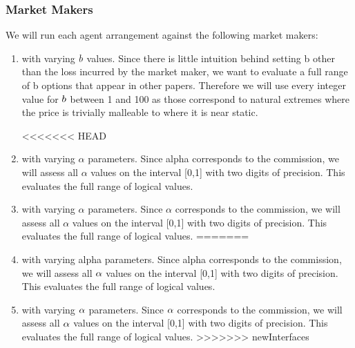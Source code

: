 \subsubsection{Market Makers}
We will run each agent arrangement against the following market makers:
\begin{enumerate}
\item {} with varying $b$ values. Since there is little intuition behind setting b other than the loss incurred by the market maker, we want to evaluate a full range of b options that appear in other papers. Therefore we will use every integer value for $b$ between 1 and 100 as those correspond to natural extremes where the price is trivially malleable to where it is near static.

<<<<<<< HEAD
\item {} with varying $\alpha$ parameters. Since alpha corresponds to the commission, we will assess all $\alpha$ values on the interval [0,1] with two digits of precision. This evaluates the full range of logical values.

\item {} with varying $\alpha$ parameters. Since $\alpha$ corresponds to the commission, we will assess all $\alpha$ values on the interval [0,1] with two digits of precision. This evaluates the full range of logical values.
=======
\item {} with varying alpha parameters. Since alpha corresponds to the commission, we will assess all $\alpha$ values on the interval [0,1] with two digits of precision. This evaluates the full range of logical values.

\item {} with varying $\alpha$ parameters. Since $\alpha$ corresponds to the commission, we will assess all $\alpha$ values on the interval [0,1] with two digits of precision. This evaluates the full range of logical values.
>>>>>>> newInterfaces
\end{enumerate}

